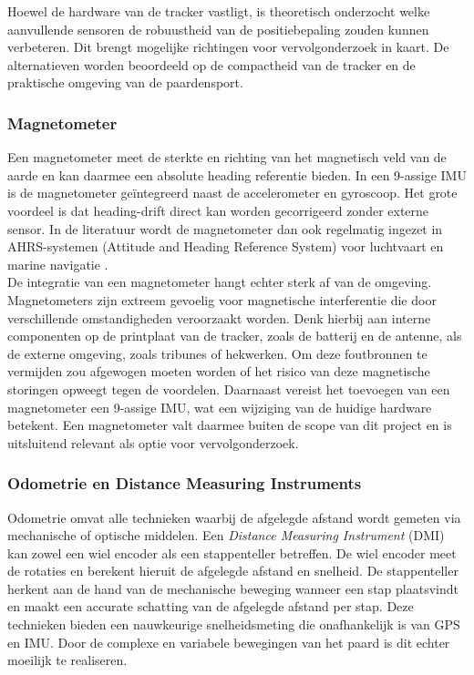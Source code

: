 Hoewel de hardware van de tracker vastligt, is theoretisch onderzocht welke aanvullende sensoren de robuustheid van de positiebepaling zouden kunnen verbeteren. Dit brengt mogelijke richtingen voor vervolgonderzoek in kaart. De alternatieven worden beoordeeld op de compactheid van de tracker en de praktische omgeving van de paardensport.

\subsubsection{Magnetometer}
Een magnetometer meet de sterkte en richting van het magnetisch veld van de aarde en kan daarmee een absolute heading referentie bieden. In een 9-assige IMU is de magnetometer geïntegreerd naast de accelerometer en gyroscoop. Het grote voordeel is dat heading-drift direct kan worden gecorrigeerd zonder externe sensor. In de literatuur wordt de magnetometer dan ook regelmatig ingezet in AHRS-systemen (Attitude and Heading Reference System) voor luchtvaart en marine navigatie \cite{bar_shalom_estimation}. \\

De integratie van een magnetometer hangt echter sterk af van de omgeving. Magnetometers zijn extreem gevoelig voor magnetische interferentie die door verschillende omstandigheden veroorzaakt worden. Denk hierbij aan interne componenten op de printplaat van de tracker, zoals de batterij en de antenne, als de externe omgeving, zoals tribunes of hekwerken. Om deze foutbronnen te vermijden zou afgewogen moeten worden of het risico van deze magnetische storingen opweegt tegen de voordelen. Daarnaast vereist het toevoegen van een magnetometer een 9-assige IMU, wat een wijziging van de huidige hardware betekent. Een magnetometer valt daarmee buiten de scope van dit project en is uitsluitend relevant als optie voor vervolgonderzoek.

\subsubsection{Odometrie en Distance Measuring Instruments}
Odometrie omvat alle technieken waarbij de afgelegde afstand wordt gemeten via mechanische of optische middelen. Een \textit{Distance Measuring Instrument} (DMI) kan zowel een wiel encoder als een stappenteller betreffen. De wiel encoder meet de rotaties en berekent hieruit de afgelegde afstand en snelheid. De stappenteller herkent aan de hand van de mechanische beweging wanneer een stap plaatsvindt en maakt een accurate schatting van de afgelegde afstand per stap. Deze technieken bieden een nauwkeurige snelheidsmeting die onafhankelijk is van GPS en IMU. Door de complexe en variabele bewegingen van het paard is dit echter moeilijk te realiseren.


